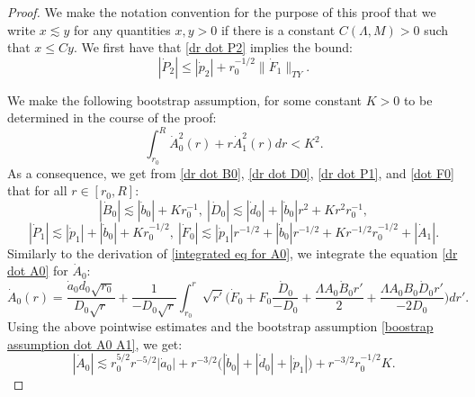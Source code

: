 \documentclass[11pt]{article}
\numberwithin{equation}{section}
\begin{document}
\begin{proof}
    We make the notation convention for the purpose of this proof that we write $x\lesssim y$ for any quantities $x,y>0$ if there is a constant $C(\Lambda,M)>0$ such that $x\leq Cy.$ We first have that \eqref{dr dot P2} implies the bound:
    \[|\dot{P}_2|\leq|\dot{p}_2|+r_0^{-1/2}\|\dot{F}_1\|_{TY}.\]
    
    We make the following bootstrap assumption, for some constant $K>0$ to be determined in the course of the proof:
    \begin{equation}\label{boostrap assumption dot A0 A1}
        \int_{r_0}^R\dot{A}_0^2(r)+r\dot{A}_1^2(r)dr<K^2.
    \end{equation}
    As a consequence, we get from \eqref{dr dot B0}, \eqref{dr dot D0}, \eqref{dr dot P1}, and \eqref{dot F0} that for all $r\in[r_0,R]$:
    \[|\dot{B}_0|\lesssim |\dot{b}_0|+Kr_0^{-1},\ |\dot{D}_0|\lesssim|\dot{d}_0|+|\dot{b}_0|r^2+Kr^2r_0^{-1},\]\[|\dot{P}_1|\lesssim|\dot{p}_1|+|\dot{b}_0|+Kr_0^{-1/2},\ |\dot{F}_0|\lesssim|\dot{p}_1|r^{-1/2}+|\dot{b}_0|r^{-1/2}+Kr^{-1/2}r_0^{-1/2}+|\dot{A}_1|.\] 
    Similarly to the derivation of \eqref{integrated eq for A0}, we integrate the equation \eqref{dr dot A0} for $\dot{A}_0$:
    \[\dot{A}_0(r)=\frac{\dot{a}_0d_0\sqrt{r_0}}{D_0\sqrt{r}}+\frac{1}{-D_0\sqrt{r}}\int_{r_0}^r\sqrt{r'}\bigg(\dot{F}_0+F_0\frac{\dot{D}_0}{-D_0}+\frac{\Lambda A_0 \dot{B}_0 r'}{2}+\frac{\Lambda A_0 B_0 \dot{D}_0 r'}{-2D_0}\bigg)dr'.\]
    Using the above pointwise estimates and the bootstrap assumption \eqref{boostrap assumption dot A0 A1}, we get:
    \begin{equation}\label{pointwise bound for dot A0}
        |\dot{A}_0|\lesssim r_0^{5/2}r^{-5/2}|\dot{a}_0|+r^{-3/2}\big(|\dot{b}_0|+|\dot{d}_0|+|\dot{p}_1|\big)+r^{-3/2}r_0^{-1/2}K.
    \end{equation}
    

\end{proof}
\end{document}
